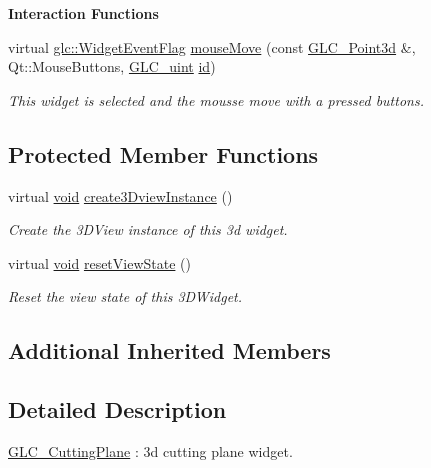 \begin{Indent}{\bf Interaction Functions}
\begin{DoxyCompactItemize}
virtual \hyperlink{namespaceglc_a7a4a1e3955352aeb2d018746fbe626d5}{glc\-::\-Widget\-Event\-Flag} \hyperlink{class_g_l_c___cutting_plane_ab126d8cbb6c55bb6d4293bcd616b34d2}{mouse\-Move} (const \hyperlink{glc__vector3d_8h_a4e13a9bbc7ab3d34de7e98b41836772c}{G\-L\-C\-\_\-\-Point3d} \&, Qt\-::\-Mouse\-Buttons, \hyperlink{glc__global_8h_abf950976fabed69026558df8e2da6c6b}{G\-L\-C\-\_\-uint} \hyperlink{glext_8h_a58c2a664503e14ffb8f21012aabff3e9}{id})
\begin{DoxyCompactList}\small\item\em This widget is selected and the mousse move with a pressed buttons. \end{DoxyCompactList}\end{DoxyCompactItemize}
\end{Indent}
\subsection*{Protected Member Functions}
\begin{DoxyCompactItemize}
\item 
virtual \hyperlink{group___u_a_v_objects_plugin_ga444cf2ff3f0ecbe028adce838d373f5c}{void} \hyperlink{class_g_l_c___cutting_plane_a2ed67a36a6d0cdf862c42b704b640f28}{create3\-Dview\-Instance} ()
\begin{DoxyCompactList}\small\item\em Create the 3\-D\-View instance of this 3d widget. \end{DoxyCompactList}\item 
virtual \hyperlink{group___u_a_v_objects_plugin_ga444cf2ff3f0ecbe028adce838d373f5c}{void} \hyperlink{class_g_l_c___cutting_plane_a223a872c836f8d5ed2e5b3a752a23f09}{reset\-View\-State} ()
\begin{DoxyCompactList}\small\item\em Reset the view state of this 3\-D\-Widget. \end{DoxyCompactList}\end{DoxyCompactItemize}
\subsection*{Additional Inherited Members}


\subsection{Detailed Description}
\hyperlink{class_g_l_c___cutting_plane}{G\-L\-C\-\_\-\-Cutting\-Plane} \-: 3d cutting plane widget. 

